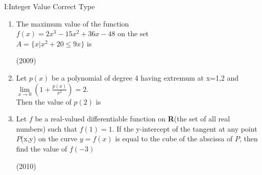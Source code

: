 \documentclass[journal,,12pt,twocolumn]{IEEEtran}
\theoremstyle{remark}
\begin{document}
\begin{flushleft}
\fontsize{18}{20} \selectfont
{I:Integer Value Correct Type}
\end{flushleft}
\begin{enumerate}
\item The maximum value of the function \\
$f(x)=2x^3-15x^2+36x-48$ on the set\\
$A=\{x|x^2+20 \le 9x\}$ is
\begin{flushright}
\hfill {(2009)}
\end{flushright}
\item Let $p(x)$ be a polynomial of degree 4 having extremum at x=1,2 and $\lim \limits_{x\to 0} \left(1+\frac{p(x)}{x^2} \right) = 2$.\\
Then the value of $p(2)$ is
\item Let $f$ be a real-valued differentiable function on \textbf{R}(the set of all real numbers) such that $f(1)=1$. If the y-intercept of the tangent at any point $P$(x,y) on the curve $y=f(x)$ is equal to the cube of the abscissa of $P$, then find the value of $f(-3)$
\begin{flushright}
    \hfill {(2010)}
\end{flushright}

\end{enumerate}
\end{document}
